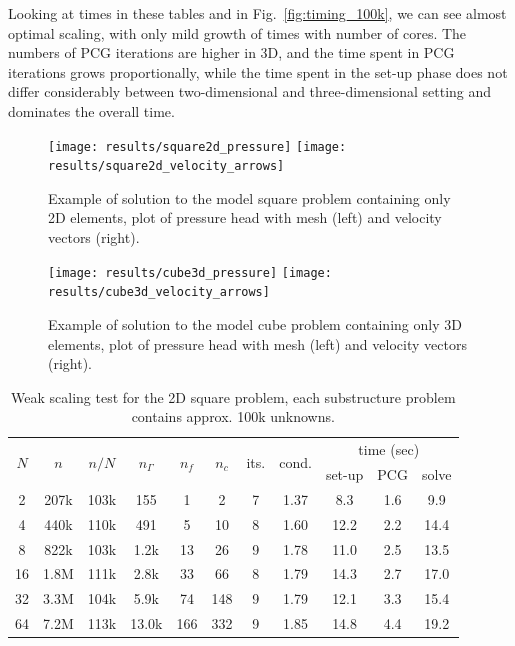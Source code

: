 Looking at times in these tables and in Fig.~\ref{fig:timing_100k}, we can see
almost optimal scaling, with only mild growth of times with number of cores.
The numbers of PCG iterations are higher in 3D, and the time spent in PCG
iterations grows proportionally, while the time spent in the set-up phase does
not differ considerably between two-dimensional and three-dimensional setting
and dominates the overall time.

\begin{figure}[ptbh]
\texttt{[image: results/square2d\_pressure]} \texttt{[image: results/square2d\_velocity\_arrows]}
\caption{\label{fig:square2d_problem}
Example of solution to the model square problem containing only 2D
elements, plot of pressure head with mesh (left) and velocity vectors (right).}
\end{figure}

\begin{figure}[ptbh]
\texttt{[image: results/cube3d\_pressure]} \texttt{[image: results/cube3d\_velocity\_arrows]}
\caption{\label{fig:cube3d_problem}
Example of solution to the model cube problem containing only 3D
elements, plot of pressure head with mesh (left) and velocity vectors (right).}
\end{figure}


\begin{table}[ptbh]
\begin{center}
\begin{tabular}
[c]{|ccc|ccc|cc|ccc|}\hline
\multirow{2}{*}{$N$} & \multirow{2}{*}{$n$} & \multirow{2}{*}{$n/N$} &
\multirow{2}{*}{$n_{\Gamma}$} & \multirow{2}{*}{$n_f$} &
\multirow{2}{*}{$n_c$} & \multirow{2}{*}{its.} & \multirow{2}{*}{cond.} &
\multicolumn{3}{c|}{time (sec)}\\
&  &  &  &  &  &  &  & set-up & PCG & solve\\\hline
2 & 207k & 103k & 155 & 1 & 2 & 7 & 1.37 & 8.3 & 1.6 & 9.9\\
4 & 440k & 110k & 491 & 5 & 10 & 8 & 1.60 & 12.2 & 2.2 & 14.4\\
8 & 822k & 103k & 1.2k & 13 & 26 & 9 & 1.78 & 11.0 & 2.5 & 13.5\\
16 & 1.8M & 111k & 2.8k & 33 & 66 & 8 & 1.79 & 14.3 & 2.7 & 17.0\\
32 & 3.3M & 104k & 5.9k & 74 & 148 & 9 & 1.79 & 12.1 & 3.3 & 15.4\\
64 & 7.2M & 113k & 13.0k & 166 & 332 & 9 & 1.85 & 14.8 & 4.4 & 19.2\\\hline
\end{tabular}
\end{center}
\caption{\label{tab:2d_square_weak_scaling}
Weak scaling test for the 2D square problem, each substructure
problem contains approx. 100k unknowns.}
\end{table}


